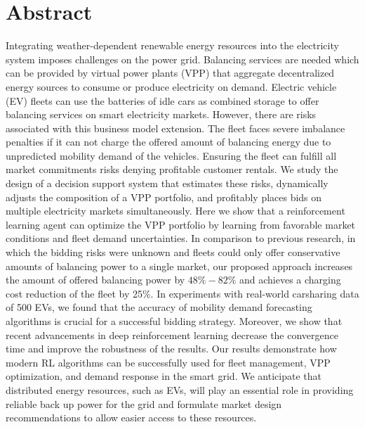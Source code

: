 \thispagestyle{empty}
\vspace*{\fill}

\section*{Abstract}
Integrating weather-dependent renewable energy resources into the electricity
system imposes challenges on the power grid. Balancing services are needed which
can be provided by virtual power plants (VPP) that aggregate decentralized
energy sources to consume or produce electricity on demand. Electric vehicle
(EV) fleets can use the batteries of idle cars as combined storage to offer
balancing services on smart electricity markets. However, there are risks
associated with this business model extension. The fleet faces severe imbalance
penalties if it can not charge the offered amount of balancing energy due to
unpredicted mobility demand of the vehicles. Ensuring the fleet can fulfill all
market commitments risks denying profitable customer rentals. We study the
design of a decision support system that estimates these risks, dynamically
adjusts the composition of a VPP portfolio, and profitably places bids on
multiple electricity markets simultaneously. Here we show that a reinforcement
learning agent can optimize the VPP portfolio by learning from favorable market
conditions and fleet demand uncertainties. In comparison to previous research,
in which the bidding risks were unknown and fleets could only offer conservative
amounts of balancing power to a single market, our proposed approach increases
the amount of offered balancing power by $48\% - 82\%$  and achieves a charging
cost reduction of the fleet by 25\%. In experiments with real-world carsharing
data of 500 EVs, we found that the accuracy of mobility demand forecasting
algorithms is crucial for a successful bidding strategy. Moreover, we show that
recent advancements in deep reinforcement learning decrease the convergence time
and improve the robustness of the results. Our results demonstrate how modern RL
algorithms can be successfully used for fleet management, VPP optimization, and
demand response in the smart grid. We anticipate that distributed energy
resources, such as EVs, will play an essential role in providing reliable back up
power for the grid and formulate market design recommendations to allow easier
access to these resources.

\vspace*{\fill}
\clearpage

